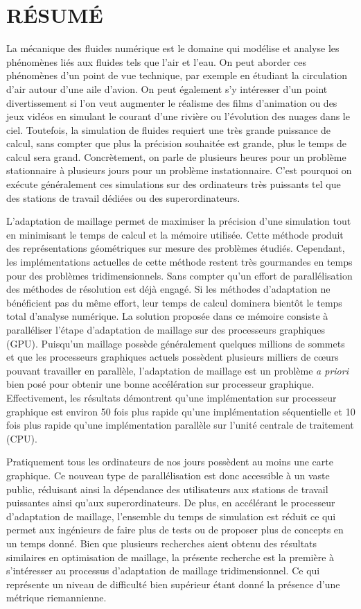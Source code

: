 \section*{\hfil RÉSUMÉ\hfil}

La mécanique des fluides numérique est le domaine qui modélise et analyse les phénomènes liés aux fluides tels que l’air et l’eau. On peut aborder ces phénomènes d’un point de vue technique, par exemple en étudiant la circulation d’air autour d’une aile d’avion. On peut également s’y intéresser d’un point divertissement si l’on veut augmenter le réalisme des films d’animation ou des jeux vidéos en simulant le courant d’une rivière ou l’évolution des nuages dans le ciel. Toutefois, la simulation de fluides requiert une très grande puissance de calcul, sans compter que plus la précision souhaitée est grande, plus le temps de calcul sera grand. Concrètement, on parle de plusieurs heures pour un problème stationnaire à plusieurs jours pour un problème instationnaire. C’est pourquoi on exécute généralement ces simulations sur des ordinateurs très puissants tel que des stations de travail dédiées ou des superordinateurs.

L’adaptation de maillage permet de maximiser la précision d’une simulation tout en minimisant le temps de calcul et la mémoire utilisée. Cette méthode produit des représentations géométriques sur mesure des problèmes étudiés. Cependant, les implémentations actuelles de cette méthode restent très gourmandes en temps pour des problèmes tridimensionnels. Sans compter qu’un effort de parallélisation des méthodes de résolution est déjà engagé. Si les méthodes d’adaptation ne bénéficient pas du même effort, leur temps de calcul dominera bientôt le temps total d’analyse numérique. La solution proposée dans ce mémoire consiste à paralléliser l’étape d’adaptation de maillage sur des processeurs graphiques (GPU). Puisqu’un maillage possède généralement quelques millions de sommets et que les processeurs graphiques actuels possèdent plusieurs milliers de cœurs pouvant travailler en parallèle, l’adaptation de maillage est un problème \textit{a priori} bien posé pour obtenir une bonne accélération sur processeur graphique. Effectivement, les résultats démontrent qu’une implémentation sur processeur graphique est environ 50 fois plus rapide qu’une implémentation séquentielle et 10 fois plus rapide qu’une implémentation parallèle sur l’unité centrale de traitement (CPU).

Pratiquement tous les ordinateurs de nos jours possèdent au moins une carte graphique. Ce nouveau type de parallélisation est donc accessible à un vaste public, réduisant ainsi la dépendance des utilisateurs aux stations de travail puissantes ainsi qu’aux superordinateurs. De plus, en accélérant le processeur d’adaptation de maillage, l’ensemble du temps de simulation est réduit ce qui permet aux ingénieurs de faire plus de tests ou de proposer plus de concepts en un temps donné. Bien que plusieurs recherches aient obtenu des résultats similaires en optimisation de maillage, la présente recherche est la première à s’intéresser au processus d’adaptation de maillage tridimensionnel. Ce qui représente un niveau de difficulté bien supérieur étant donné la présence d’une métrique riemannienne.

